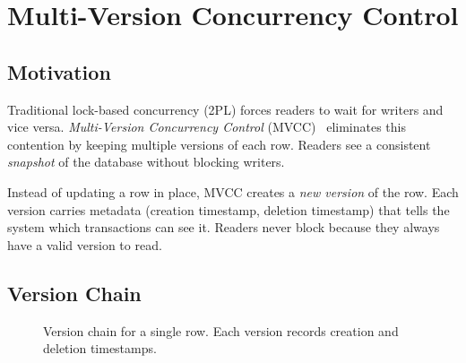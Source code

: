 \chapter{Multi-Version Concurrency Control}
\label{ch:mvcc}

\section{Motivation}

Traditional lock-based concurrency (2PL) forces readers to wait for writers and vice versa.  \emph{Multi-Version Concurrency Control} (MVCC)~\cite{reed1978naming} eliminates this contention by keeping multiple versions of each row.  Readers see a consistent \emph{snapshot} of the database without blocking writers.

\begin{conceptbox}
Instead of updating a row in place, MVCC creates a \emph{new version} of the row.  Each version carries metadata (creation timestamp, deletion timestamp) that tells the system which transactions can see it.  Readers never block because they always have a valid version to read.
\end{conceptbox}

\section{Version Chain}

\begin{figure}[H]
\centering
{}
\caption{Version chain for a single row.  Each version records creation and deletion timestamps.}
\label{fig:version-chain}
\end{figure}

